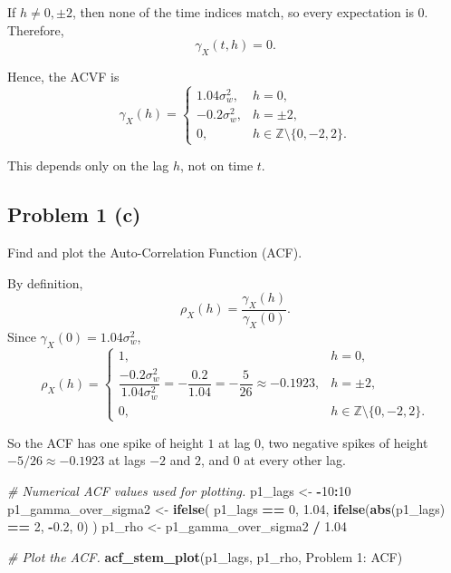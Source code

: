 \documentclass[
  10pt,
]{extarticle}
\newenvironment{Shaded}{\begin{snugshade}}{\end{snugshade}}
\newcommand{\CommentTok}[1]{\textcolor[rgb]{0.56,0.35,0.01}{\textit{#1}}}
\newcommand{\DecValTok}[1]{\textcolor[rgb]{0.00,0.00,0.81}{#1}}
\newcommand{\FloatTok}[1]{\textcolor[rgb]{0.00,0.00,0.81}{#1}}
\newcommand{\FunctionTok}[1]{\textcolor[rgb]{0.13,0.29,0.53}{\textbf{#1}}}
\newcommand{\NormalTok}[1]{#1}
\newcommand{\OtherTok}[1]{\textcolor[rgb]{0.56,0.35,0.01}{#1}}
\newcommand{\SpecialCharTok}[1]{\textcolor[rgb]{0.81,0.36,0.00}{\textbf{#1}}}
\newcommand{\StringTok}[1]{\textcolor[rgb]{0.31,0.60,0.02}{#1}}
\newcounter{none} %
\begin{document}
If \(h \neq 0,\pm2\), then none of the time indices match, so every expectation is \(0\). Therefore,
\[
\gamma_X(t,h) = 0.
\]

Hence, the ACVF is
\[
\gamma_X(h) =
\begin{cases}
1.04\sigma_w^2, & h=0,\\
-0.2\sigma_w^2, & h=\pm2,\\
0, & h \in \mathbb{Z}\setminus\{0,-2,2\}.
\end{cases}
\]

This depends only on the lag \(h\), not on time \(t\).

\newpage

\subsection{Problem 1 (c)}\label{problem-1-c}

\begin{problem}[Problem 1 (c)]
Find and plot the Auto-Correlation Function (ACF).
\end{problem}

By definition,
\[
\rho_X(h) = \frac{\gamma_X(h)}{\gamma_X(0)}.
\]
Since \(\gamma_X(0)=1.04\sigma_w^2\),
\[
\rho_X(h) =
\begin{cases}
1, & h=0,\\
\dfrac{-0.2\sigma_w^2}{1.04\sigma_w^2} = -\dfrac{0.2}{1.04} = -\dfrac{5}{26} \approx -0.1923, & h=\pm2,\\
0, & h \in \mathbb{Z}\setminus\{0,-2,2\}.
\end{cases}
\]

So the ACF has one spike of height \(1\) at lag \(0\), two negative spikes of height \(-5/26 \approx -0.1923\) at lags \(-2\) and \(2\), and \(0\) at every other lag.

\begin{Shaded}
\begin{Highlighting}[]
\CommentTok{\# Numerical ACF values used for plotting.}
\NormalTok{p1\_lags }\OtherTok{\textless{}{-}} \SpecialCharTok{{-}}\DecValTok{10}\SpecialCharTok{:}\DecValTok{10}
\NormalTok{p1\_gamma\_over\_sigma2 }\OtherTok{\textless{}{-}} \FunctionTok{ifelse}\NormalTok{(}
\NormalTok{  p1\_lags }\SpecialCharTok{==} \DecValTok{0}\NormalTok{,}
  \FloatTok{1.04}\NormalTok{,}
  \FunctionTok{ifelse}\NormalTok{(}\FunctionTok{abs}\NormalTok{(p1\_lags) }\SpecialCharTok{==} \DecValTok{2}\NormalTok{, }\SpecialCharTok{{-}}\FloatTok{0.2}\NormalTok{, }\DecValTok{0}\NormalTok{)}
\NormalTok{)}
\NormalTok{p1\_rho }\OtherTok{\textless{}{-}}\NormalTok{ p1\_gamma\_over\_sigma2 }\SpecialCharTok{/} \FloatTok{1.04}

\CommentTok{\# Plot the ACF.}
\FunctionTok{acf\_stem\_plot}\NormalTok{(p1\_lags, p1\_rho, }\StringTok{\textquotesingle{}Problem 1: ACF\textquotesingle{}}\NormalTok{)}
\end{Highlighting}
\end{Shaded}
\end{document}
